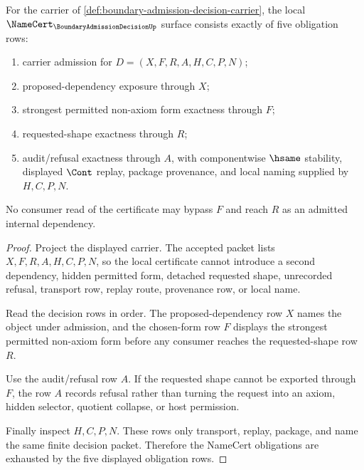 \begin{theorem}
\label{thm:boundary-admission-decision-namecert-obligations}
For the carrier of \autoref{def:boundary-admission-decision-carrier}, the local $\NameCert_{\BoundaryAdmissionDecisionUp}$ surface consists exactly of five obligation rows:
\begin{enumerate}
\item carrier admission for $D=(X,F,R,A,H,C,P,N)$;
\item proposed-dependency exposure through $X$;
\item strongest permitted non-axiom form exactness through $F$;
\item requested-shape exactness through $R$;
\item audit/refusal exactness through $A$, with componentwise $\hsame$ stability, displayed $\Cont$ replay, package provenance, and local naming supplied by $H,C,P,N$.
\end{enumerate}
No consumer read of the certificate may bypass $F$ and reach $R$ as an admitted internal dependency.
\end{theorem}
\begin{proof}
Project the displayed carrier. The accepted packet lists $X,F,R,A,H,C,P,N$, so the local certificate cannot introduce a second dependency, hidden permitted form, detached requested shape, unrecorded refusal, transport row, replay route, provenance row, or local name.

Read the decision rows in order. The proposed-dependency row $X$ names the object under admission, and the chosen-form row $F$ displays the strongest permitted non-axiom form before any consumer reaches the requested-shape row $R$.

Use the audit/refusal row $A$. If the requested shape cannot be exported through $F$, the row $A$ records refusal rather than turning the request into an axiom, hidden selector, quotient collapse, or host permission.

Finally inspect $H,C,P,N$. These rows only transport, replay, package, and name the same finite decision packet. Therefore the NameCert obligations are exhausted by the five displayed obligation rows.
\end{proof}

